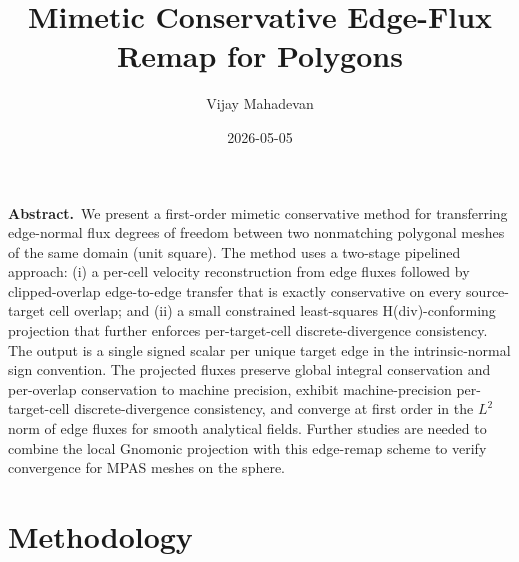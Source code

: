 \documentclass[10pt]{article}
\title{\vspace{-1.6em}Mimetic Conservative Edge-Flux Remap for Polygons}
\author{Vijay Mahadevan}
\date{\vspace{-0.6em}2026-05-05\vspace{-1em}}
\begin{document}
\maketitle

\noindent\textbf{Abstract.}\,
We present a first-order mimetic conservative method for transferring edge-normal flux degrees of freedom between two nonmatching polygonal meshes of the same domain (unit square). The method uses a two-stage pipelined approach: (i) a per-cell velocity reconstruction from edge fluxes followed by clipped-overlap edge-to-edge transfer that is exactly conservative on every source-target cell overlap; and (ii) a small constrained least-squares H(div)-conforming projection that further enforces per-target-cell discrete-divergence consistency. The output is a single signed scalar per unique target edge in the intrinsic-normal sign convention. The projected fluxes preserve global integral conservation and per-overlap conservation to machine precision, exhibit machine-precision per-target-cell discrete-divergence consistency, and converge at first order in the $L^2$ norm of edge fluxes for smooth analytical fields. Further studies are needed to combine the local Gnomonic projection with this edge-remap scheme to verify convergence for MPAS meshes on the sphere.

\section{Methodology}
\end{document}
